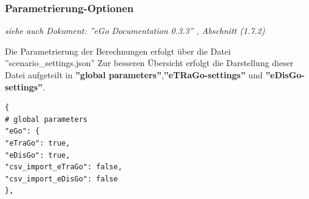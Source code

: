 \documentclass[
a4paper,     %
12pt         %
]{scrartcl}  %
\begin{document}
\subsubsection{Parametrierung-Optionen}
\label{param-opt}
\textit{siehe auch Dokument: ''eGo Documentation 0.3.3'' , Abschnitt (1.7.2)}

Die Parametrierung der Berechnungen erfolgt über die Datei ''scenario\_settings.json''
Zur besseren Übersicht erfolgt die Darstellung dieser Datei aufgeteilt in \textbf{''global parameters''},\textbf{''eTRaGo-settings''} und \textbf{''eDisGo-settings''}.

\begin{lstlisting}
{
# global parameters
"eGo": {
"eTraGo": true,
"eDisGo": true,
"csv_import_eTraGo": false,
"csv_import_eDisGo": false
},
\end{lstlisting}
\end{document}
